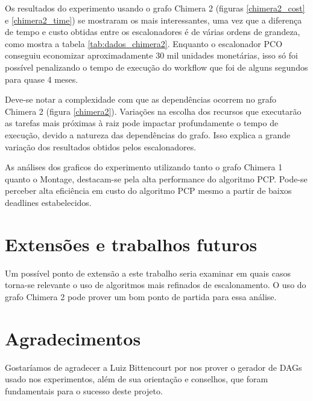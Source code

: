 \documentclass[a4paper,10pt]{article}
\begin{document}
Os resultados do experimento usando o grafo Chimera 2 (figuras \ref{chimera2_cost} e \ref{chimera2_time})
se mostraram os mais interessantes, uma vez que a diferença de tempo e custo obtidas entre os escalonadores
é de várias ordens de grandeza, como mostra a tabela \ref{tab:dados_chimera2}. Enquanto o escalonador PCO
conseguiu economizar aproximadamente 30 mil unidades monetárias, isso só foi possível penalizando o tempo
de execução do workflow que foi de alguns segundos para quase 4 meses.

Deve-se notar a complexidade com que as dependências ocorrem no grafo Chimera 2 (figura \ref{chimera2}).
Variações na escolha dos recursos que executarão as tarefas mais próximas à raiz pode impactar profundamente
o tempo de execução, devido a natureza das dependências do grafo. Isso explica a grande variação dos resultados
obtidos pelos escalonadores.

As análises dos graficos do experimento utilizando tanto o grafo Chimera 1 quanto o Montage, destacam-se pela alta performance do algoritmo PCP. Pode-se perceber alta eficiência em custo do algoritmo PCP mesmo a partir de baixos deadlines estabelecidos.

\section{Extensões e trabalhos futuros}

Um possível ponto de extensão a este trabalho seria examinar em quais casos torna-se relevante o uso
de algoritmos mais refinados de escalonamento. O uso do grafo Chimera 2 pode prover um bom ponto de
partida para essa análise.

\section{Agradecimentos}

Gostaríamos de agradecer a Luiz Bittencourt por nos
prover o gerador de DAGs usado nos experimentos, além de sua orientação e
conselhos, que foram fundamentais para o sucesso deste projeto.
\end{document}
